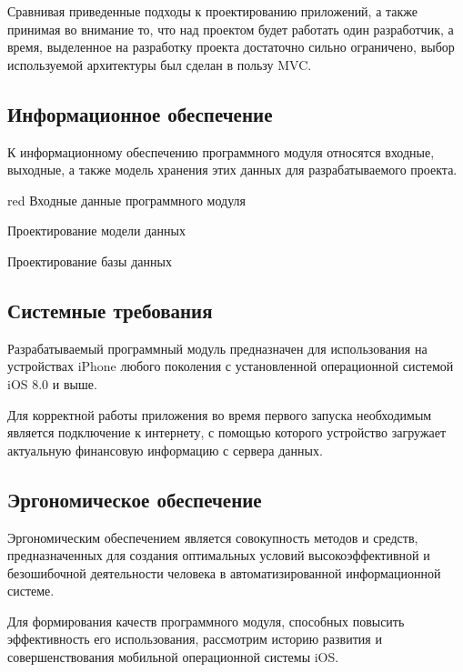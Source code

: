 Сравнивая приведенные подходы к проектированию приложений, а также принимая
во внимание то, что над проектом будет работать один разработчик, а время,
выделенное на разработку проекта достаточно сильно ограничено, выбор
используемой архитектуры был сделан в пользу MVC.



\subsection{Информационное обеспечение}

К информационному обеспечению программного модуля относятся входные, выходные,
а также модель хранения этих данных для разрабатываемого проекта.

\begin{color}{red}
Входные данные программного модуля

Проектирование модели данных

Проектирование базы данных
\end{color}



\subsection{Системные требования}

Разрабатываемый программный модуль предназначен для использования на устройствах
iPhone любого поколения с установленной операционной системой iOS 8.0 и выше.

Для корректной работы приложения во время первого запуска необходимым является
подключение к интернету, с помощью которого устройство загружает актуальную
финансовую информацию с сервера данных.


\subsection{Эргономическое обеспечение}

Эргономическим обеспечением является совокупность методов и средств,
предназначенных для создания оптимальных условий высокоэффективной и
безошибочной деятельности человека в автоматизированной информационной системе.

Для формирования качеств программного модуля, способных повысить эффективность его
использования, рассмотрим историю развития и совершенствования мобильной
операционной системы iOS.

